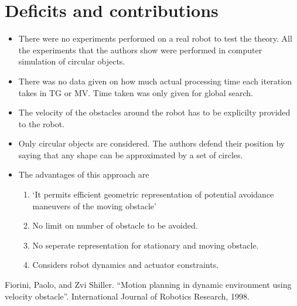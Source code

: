 \documentclass[12pt]{article}
\begin{document}
\section{Deficits and contributions}
\begin{itemize}
    \item There were no experiments performed on a real robot to test the theory. All the experiments that the authors show were performed in computer simulation of circular objects.
    \item There was no data given on how much actual processing time each iteration takes in TG or MV\@. Time taken was only given for global search.
    \item The velocity of the obstacles around the robot has to be explicilty provided to the robot.
    \item Only circular objects are considered. The authors defend their position by saying that any shape can be approximated by a set of circles.
    \item The advantages of this approach are
        \begin{enumerate}
            \item `It permits efficient geometric representation of potential avoidance maneuvers of the moving obstacle'
            \item No limit on number of obstacle to be avoided.
            \item No seperate representation for stationary and moving obstacle.
            \item Considers robot dynamics and actuator constraints.
        \end{enumerate}
\end{itemize}
\begin{thebibliography}{1}
     Fiorini, Paolo, and Zvi Shiller. ``Motion planning in dynamic environment using velocity obstacle''. International Journal of Robotics Research, 1998.
\end{thebibliography}
\end{document}
